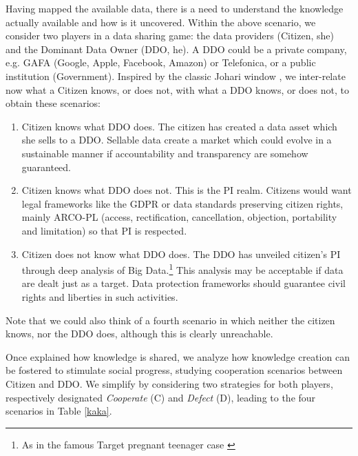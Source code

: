 Having mapped the available data, there is a need to understand the 
knowledge actually available and how is it uncovered.	
Within the above scenario, 
we consider two players in  a data 
sharing game: the data providers 
(Citizen, she) and the Dominant Data Owner (DDO, he).
A DDO could be a private
company, e.g. GAFA (Google, Apple, Facebook, Amazon) or Telefonica,
or a public institution (Government). 
Inspired by the classic Johari window \cite{johari},
we inter-relate now what a Citizen knows, or does not,
with what a DDO knows, or does not,
to obtain these scenarios:
\begin{enumerate}
\item Citizen knows what DDO does.
The citizen has created 
a data asset which she sells to a DDO. 
Sellable data create a market which could 
evolve in a sustainable manner if accountability and transparency are somehow guaranteed.
\item 	Citizen knows what DDO does not.
This is the PI realm.
Citizens would want legal frameworks like the 
GDPR or data standards preserving  
citizen rights, mainly 
ARCO-PL (access, rectification, cancellation, objection, portability
and limitation) so that PI is respected.
\item Citizen does not know what DDO does. 
The DDO has unveiled
citizen’s PI through deep analysis of
Big Data.\footnote{As in the famous Target pregnant
teenager case \cite{target}} 
This analysis may be acceptable if data are dealt just as a target.
Data protection frameworks should guarantee civil rights and liberties in such activities.
\end{enumerate}
Note that we could also think of a fourth scenario in which 
neither the citizen knows, nor the DDO does, although this is clearly unreachable. 

Once explained how knowledge is shared, we analyze how 
knowledge creation can be fostered to stimulate social progress, studying 
cooperation  scenarios between Citizen and DDO. 
We simplify by considering two strategies
for both players, respectively designated {\em Cooperate}  (C)
and {\em Defect} (D), leading to the four scenarios 
in Table
\ref{kaka}.

